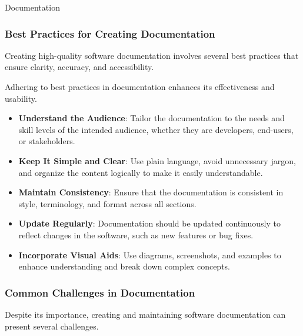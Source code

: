 \begin{notes}{Documentation}
\begin{highlight}
    \end{highlight}
    
    \subsubsection*{Best Practices for Creating Documentation}
    
    Creating high-quality software documentation involves several best practices that ensure clarity, accuracy, and accessibility.
    
    \begin{highlight}
    
        Adhering to best practices in documentation enhances its effectiveness and usability.
        
        \begin{itemize}
            \item \textbf{Understand the Audience}: Tailor the documentation to the needs and skill levels of the intended audience, whether they are developers, end-users, or stakeholders.
            \item \textbf{Keep It Simple and Clear}: Use plain language, avoid unnecessary jargon, and organize the content logically to make it easily understandable.
            \item \textbf{Maintain Consistency}: Ensure that the documentation is consistent in style, terminology, and format across all sections.
            \item \textbf{Update Regularly}: Documentation should be updated continuously to reflect changes in the software, such as new features or bug fixes.
            \item \textbf{Incorporate Visual Aids}: Use diagrams, screenshots, and examples to enhance understanding and break down complex concepts.
        \end{itemize}
    
    \end{highlight}
    
    \subsubsection*{Common Challenges in Documentation}
    
    Despite its importance, creating and maintaining software documentation can present several challenges.
    
    \begin{highlight}
    

\end{highlight}
\end{notes}

